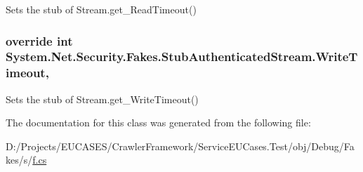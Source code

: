 Sets the stub of Stream.\-get\-\_\-\-Read\-Timeout()

\hypertarget{class_system_1_1_net_1_1_security_1_1_fakes_1_1_stub_authenticated_stream_a765d640afb4d46c4a08e999fdb4c9bde}{
\subsubsection[{Write\-Timeout}]{\setlength{\rightskip}{0pt plus 5cm}override int System.\-Net.\-Security.\-Fakes.\-Stub\-Authenticated\-Stream.\-Write\-Timeout\hspace{0.3cm}{\ttfamily [get]}, {\ttfamily [set]}}}\label{class_system_1_1_net_1_1_security_1_1_fakes_1_1_stub_authenticated_stream_a765d640afb4d46c4a08e999fdb4c9bde}


Sets the stub of Stream.\-get\-\_\-\-Write\-Timeout()



The documentation for this class was generated from the following file\-:\begin{DoxyCompactItemize}
\item 
D\-:/\-Projects/\-E\-U\-C\-A\-S\-E\-S/\-Crawler\-Framework/\-Service\-E\-U\-Cases.\-Test/obj/\-Debug/\-Fakes/s/\hyperlink{s_2f_8cs}{f.\-cs}\end{DoxyCompactItemize}
